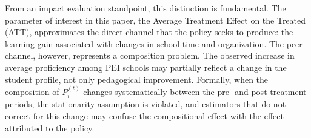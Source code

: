From an impact evaluation standpoint, this distinction is fundamental. The parameter of interest in this paper, the Average Treatment Effect on the Treated (ATT), approximates the direct channel that the policy seeks to produce: the learning gain associated with changes in school time and organization. The peer channel, however, represents a composition problem. The observed increase in average proficiency among PEI schools may partially reflect a change in the student profile, not only pedagogical improvement. Formally, when the composition of $P_i^{(t)}$ changes systematically between the pre- and post-treatment periods, the stationarity assumption is violated, and estimators that do not correct for this change may confuse the compositional effect with the effect attributed to the policy.

